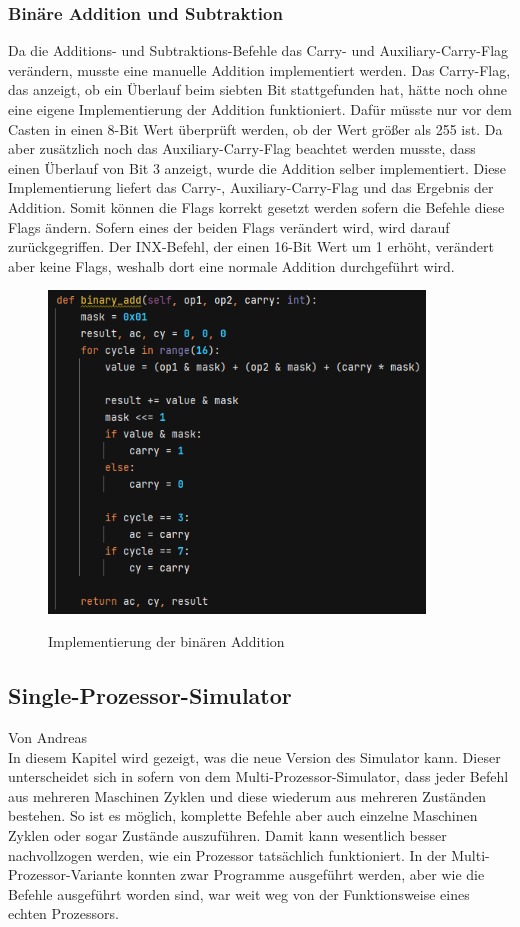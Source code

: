 \documentclass[12pt]{article}
\newcommand{\imgSpaceBefore}{\\[0.2cm]}
\begin{document}
\subsubsection{Binäre Addition und Subtraktion}
Da die Additions- und Subtraktions-Befehle das Carry- und Auxiliary-Carry-Flag verändern, musste eine manuelle Addition implementiert werden. Das Carry-Flag, das anzeigt, ob ein Überlauf beim siebten Bit stattgefunden hat, hätte noch ohne eine eigene Implementierung der Addition funktioniert. Dafür müsste nur vor dem Casten in einen 8-Bit Wert überprüft werden, ob der Wert größer als 255 ist. Da aber zusätzlich noch das Auxiliary-Carry-Flag beachtet werden musste, dass einen Überlauf von Bit 3 anzeigt, wurde die Addition selber implementiert. Diese Implementierung liefert das Carry-, Auxiliary-Carry-Flag und das Ergebnis der Addition. Somit können die Flags korrekt gesetzt werden sofern die Befehle diese Flags ändern. Sofern eines der beiden Flags verändert wird, wird darauf zurückgegriffen. Der INX-Befehl, der einen 16-Bit Wert um 1 erhöht, verändert aber keine Flags, weshalb dort eine normale Addition durchgeführt wird.
\imgSpaceBefore
\begin{figure}[H]
\caption{Implementierung der binären Addition}
\centering
\includegraphics[width=10cm]{Bilder/binaere_addition}
\label{fig:binaere_addition}
\end{figure}

\subsection{Single-Prozessor-Simulator}
\label{SPS_impl}
Von Andreas\\

\noindent
In diesem Kapitel wird gezeigt, was die neue Version des Simulator kann. Dieser unterscheidet sich in sofern von dem Multi-Prozessor-Simulator, dass jeder Befehl aus mehreren Maschinen Zyklen und diese wiederum aus mehreren Zuständen bestehen. So ist es möglich, komplette Befehle aber auch einzelne Maschinen Zyklen oder sogar Zustände auszuführen. Damit kann wesentlich besser nachvollzogen werden, wie ein Prozessor tatsächlich funktioniert. In der Multi-Prozessor-Variante konnten zwar Programme ausgeführt werden, aber wie die Befehle ausgeführt worden sind, war weit weg von der Funktionsweise eines echten Prozessors. 
\end{document}
